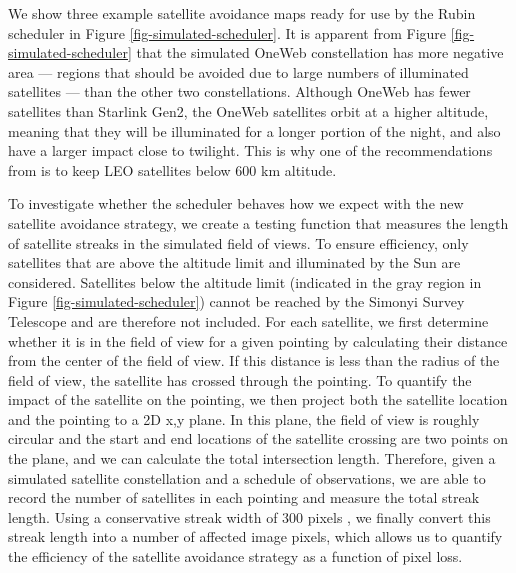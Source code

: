 \documentclass[twocolumn]{aastex631}
\begin{document}
\begin{figure*}[ht!]
\caption{Satellite avoidance maps constructed for the Rubin scheduler for each simulated constellation. Each is for a twilight observation period of 90 minutes (beginning after sunset with a Sun altitude of $-17.1$ degrees). The maps are rotated so zenith is in the center of the image. Darker regions have more illuminated satellites and therefore more negative weighting. By varying the ``dodging weight'' placed on these maps, the scheduler will more actively avoid regions of the sky where satellites could streak images.
\vspace{3em}
\label{fig-simulated-scheduler}
}
\end{figure*}

We show three example satellite avoidance maps ready for use by the Rubin scheduler in Figure \ref{fig-simulated-scheduler}. It is apparent from Figure \ref{fig-simulated-scheduler} that the simulated OneWeb constellation has more negative area --- regions that should be avoided due to large numbers of illuminated satellites --- than the other two constellations. Although OneWeb has fewer satellites than Starlink Gen2, the OneWeb satellites orbit at a higher altitude, meaning that they will be illuminated for a longer portion of the night, and also have a larger impact close to twilight. This is why one of the recommendations from \citet{satcon1} is to keep LEO satellites below 600 km altitude.

To investigate whether the scheduler behaves how we expect with the new satellite avoidance strategy, we create a testing function that measures the length of satellite streaks in the simulated field of views. To ensure efficiency, only satellites that are above the altitude limit and illuminated by the Sun are considered. Satellites below the altitude limit (indicated in the gray region in Figure \ref{fig-simulated-scheduler}) cannot be reached by the Simonyi Survey Telescope and are therefore not included. For each satellite, we first determine whether it is in the field of view for a given pointing by calculating their distance from the center of the field of view. If this distance is less than the radius of the field of view, the satellite has crossed through the pointing. To quantify the impact of the satellite on the pointing, we then project both the satellite location and the pointing to a 2D x,y plane. In this plane, the field of view is roughly circular and the start and end locations of the satellite crossing are two points on the plane, and we can calculate the total intersection length. Therefore, given a simulated satellite constellation and a schedule of observations, we are able to record the number of satellites in each pointing and measure the total streak length. Using a conservative streak width of 300 pixels \citep[$\sim1$ arcminute per][]{hasan22}, we finally convert this streak length into a number of affected image pixels, which allows us to quantify the efficiency of the satellite avoidance strategy as a function of pixel loss.
\end{document}
